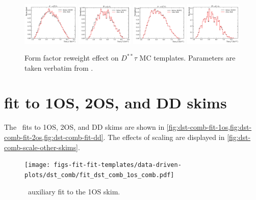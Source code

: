 \begin{figure}[ht]
    \includegraphics[width=0.24\textwidth]{
        ./figs-supplemental-plots/Dstst-form-factors/DststTau/D1stst0Tau.pdf
    }
    \includegraphics[width=0.24\textwidth]{
        ./figs-supplemental-plots/Dstst-form-factors/DststTau/D1ststTau.pdf
    }
    \includegraphics[width=0.24\textwidth]{
        ./figs-supplemental-plots/Dstst-form-factors/DststTau/D2stst0Tau.pdf
    }
    \includegraphics[width=0.24\textwidth]{
        ./figs-supplemental-plots/Dstst-form-factors/DststTau/D2ststTau.pdf
    }

    \caption{
        Form factor reweight effect on $D^{**}\tau$ MC templates.
        Parameters are taken verbatim from \cite{Bernlochner_2018}.
    }
    \label{fig:ff-rwt-raw-Dstst-sig-like}
\end{figure}


\section{\DstComb fit to 1OS, 2OS, and DD skims}
\label{appx:suppl:dst-comb}

The \DstComb\ fits to 1OS, 2OS, and DD skims are shown in
\cref{fig:dst-comb-fit-1os,fig:dst-comb-fit-2os,fig:dst-comb-fit-dd}.
The effects of scaling are displayed in
\cref{fig:dst-comb-scale-other-skims}.

\begin{figure}[htb]
    \centering
    \texttt{[image: figs-fit-fit-templates/data-driven-plots/dst\_comb/fit\_dst\_comb\_1os\_comb.pdf]}
    \caption{
        \DstComb\ auxiliary fit to the 1OS skim.
    }
    \label{fig:dst-comb-fit-1os}
\end{figure}

